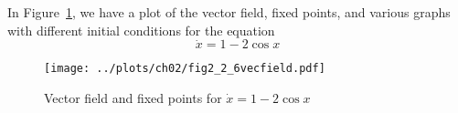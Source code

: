 
In Figure~\ref{fig2_2_6vecfield}, we have a plot of the vector field, fixed points,
and various graphs with different initial conditions for the equation 
\[
    \dot{x} = 1 - 2\cos{x} 
\]
\begin{figure}[!ht]
    \texttt{[image: ../plots/ch02/fig2\_2\_6vecfield.pdf]}
    \caption{Vector field and fixed points for $\dot{x} = 1 - 2\cos{x}$
        \label{fig2_2_6vecfield}}
\end{figure}
